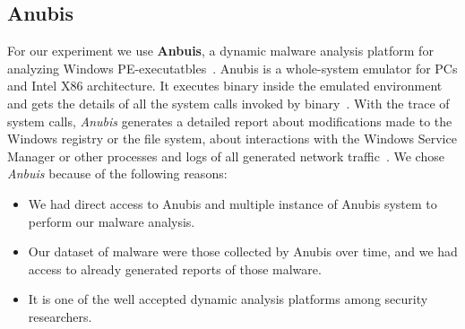 \subsection{Anubis}
\label{sub:Anubis}
For our experiment we use \textbf{Anbuis}, a dynamic malware analysis platform for analyzing Windows PE-executatbles~\cite[]{anubis}.
Anubis is a whole-system emulator for PCs and Intel X86 architecture.
It executes binary inside the emulated environment and gets the details of all the system calls invoked by binary~\cite[]{bayer}.
With the trace of system calls, \emph{Anubis} generates a detailed report about modifications made to the Windows registry or the file system, about interactions with the Windows Service Manager or other processes and logs of all generated network traffic~\cite[]{anubis}.
We chose \emph{Anbuis} because of the following reasons:
\begin{itemize}
  \item We had direct access to Anubis and multiple instance of Anubis system to perform our malware analysis.
  \item Our dataset of malware were those collected by Anubis over time, and we had access to already generated reports of those malware.
  \item It is one of the well accepted dynamic analysis platforms among security researchers.
\end{itemize}


